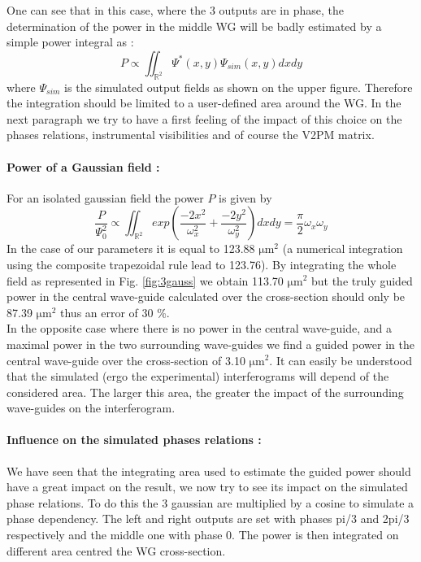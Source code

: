 One can see that in this case, where the 3 outputs are in phase, the
determination of the power in the middle WG will be badly estimated by
a simple power integral as : 
\begin{equation} \label{Eq:powerint}
P \propto \iint_{\mathbb{R}^2}
  \Psi^*(x,y)\Psi_{sim}(x,y) dxdy
  \end{equation}
  where $\Psi_{sim}$ is the simulated
output fields as shown on the upper figure. Therefore the integration
should be limited to a user-defined area around the WG. In the next
paragraph we try to have a first feeling of the impact of this choice on the phases
relations, instrumental visibilities and of course the V2PM matrix.

\paragraph{Power of a Gaussian field :}

For an isolated gaussian field the power $P$ is given by \[ \frac{P}{\Psi_0^2} \propto \iint_{\mathbb{R}^2} exp\left( \frac{-2x^2}{\omega_x^2} + \frac{-2y^2}{\omega_y^2} \right) dx dy = \frac{\pi}{2} \omega_x \omega_y\]
In the case of our parameters it is equal to 123.88
$\si{\micro\meter}^2$  (a numerical
integration using the composite trapezoidal rule lead to 123.76). By integrating the whole field as represented
in Fig. \ref{fig:3gauss} we obtain 113.70 $\si{\micro\meter}^2$ but
the truly guided power in the central wave-guide calculated over the
cross-section should only be 87.39 $\si{\micro\meter}^2$ thus an error
of 30 \%. \\
In the opposite case where there is no power in the central
wave-guide, and a maximal power in the two surrounding wave-guides we
find a  guided power in the central wave-guide over the
cross-section of 3.10 $\si{\micro\meter}^2$. It can easily be
understood that the simulated (ergo the experimental) interferograms
will depend of the considered area. The larger this area, the greater
the impact of the surrounding wave-guides on the interferogram.

\paragraph{Influence on the simulated phases relations :}

We have seen that the integrating area used to estimate the guided
power should have a great
impact on the result, we now try to see its impact on the simulated
phase relations. To do this the 3 gaussian are multiplied by a cosine
to simulate a phase dependency. The left and right outputs are set
with phases pi/3 and 2pi/3 respectively and the middle one with phase
0. The power is then integrated on different area centred the WG
cross-section.

